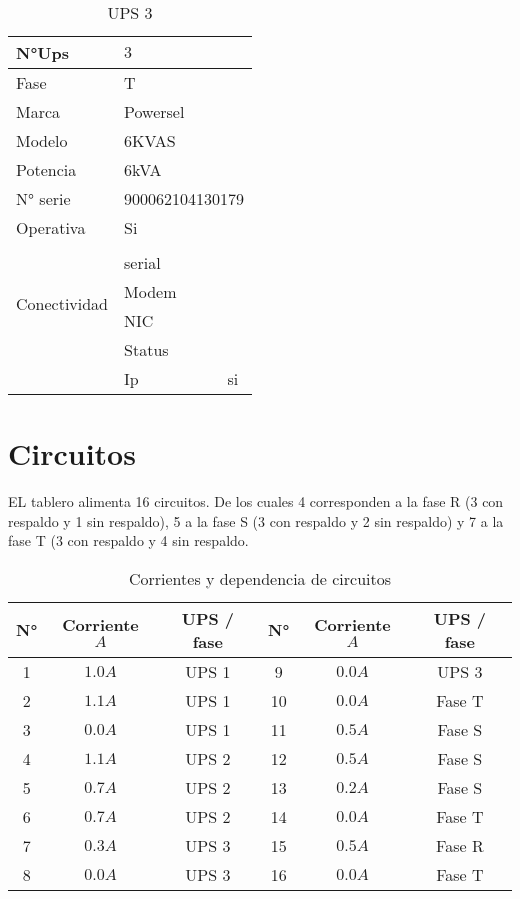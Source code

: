 \documentclass{article}
\begin{document}
\begin{center}
    \begin{table}[H]
        \centering
        \begin{tabular}{l l c}
            N°Ups & $3$ \\\hline
            Fase & \multicolumn{2}{l}{T} \\
            Marca & \multicolumn{2}{l}{Powersel} \\
            Modelo & \multicolumn{2}{l}{6KVAS} \\
            Potencia & \multicolumn{2}{l}{6kVA}\\
            N° serie & \multicolumn{2}{l}{900062104130179} \\
            Operativa & \multicolumn{2}{l}{Si} \\
            \multirow{5}{2cm}{Conectividad} & \\ & serial & \\
            & Modem & \\
            & NIC & \\
            & Status & \\
            & Ip & si\\
        \end{tabular}
        \caption{UPS 3}
        \label{tab:UPS3}
    \end{table}
\end{center}

\section{Circuitos}

EL tablero alimenta 16 circuitos. De los cuales 4 corresponden a la fase R (3 con respaldo y 1 sin respaldo), 5 a la fase S (3 con respaldo y 2 sin respaldo) y 7 a la fase T (3 con respaldo y 4 sin respaldo.

\begin{center}
    \begin{table}[H]
        \centering
        \begin{tabular}{c c c | c c c}
            N° & Corriente $A$ & UPS / fase & N° & Corriente $A$ & UPS / fase \\\hline
            1 & $1.0 A$ & UPS 1 & 9 & $0.0 A$ & UPS 3\\
            2 & $1.1 A$ & UPS 1 & 10 & $0.0 A$ & Fase T\\
            3 & $0.0 A$ & UPS 1 & 11 & $0.5 A$ & Fase S\\
            4 & $1.1 A$ & UPS 2 & 12 & $0.5 A$ & Fase S\\
            5 & $0.7 A$ & UPS 2 & 13 & $0.2 A$ & Fase S\\
            6 & $0.7 A$ & UPS 2 & 14 & $0.0 A$ & Fase T\\
            7 & $0.3 A$ & UPS 3 & 15 & $0.5 A$ & Fase R\\
            8 & $0.0 A$ & UPS 3 & 16 & $0.0 A$ & Fase T
            
        \end{tabular}
        \caption{Corrientes y dependencia de circuitos}
        \label{tab:circuitos}
    \end{table}
\end{center}
\end{document}

